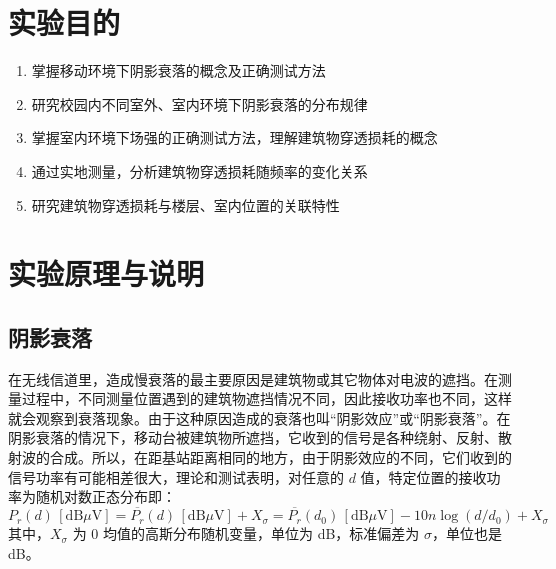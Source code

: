 \documentclass{../ElectromagneticFieldTemplate}
\newcommand{\dbmv}{\text{dB}\mu\text{V}}
\begin{document}
\maketitle


\section{实验目的}
\begin{enumerate}
    \item 掌握移动环境下阴影衰落的概念及正确测试方法
    \item 研究校园内不同室外、室内环境下阴影衰落的分布规律
    \item 掌握室内环境下场强的正确测试方法，理解建筑物穿透损耗的概念
    \item 通过实地测量，分析建筑物穿透损耗随频率的变化关系
    \item 研究建筑物穿透损耗与楼层、室内位置的关联特性
\end{enumerate}

\section{实验原理与说明}

\subsection{阴影衰落}

在无线信道里，造成慢衰落的最主要原因是建筑物或其它物体对电波的遮挡。在测量过程中，不同测量位置遇到的建筑物遮挡情况不同，因此接收功率也不同，这样就会观察到衰落现象。由于这种原因造成的衰落也叫“阴影效应”或“阴影衰落”。在阴影衰落的情况下，移动台被建筑物所遮挡，它收到的信号是各种绕射、反射、散射波的合成。所以，在距基站距离相同的地方，由于阴影效应的不同，它们收到的信号功率有可能相差很大，理论和测试表明，对任意的 \(d\) 值，特定位置的接收功率为随机对数正态分布即：
\begin{equation}
P_r(d)\,[\dbmv] = \overline{P_r}(d)\,[\dbmv] + X_{\sigma} = \overline{P_r}(d_0)\,[\dbmv] - 10n\log(d/d_0) + X_{\sigma} \tag{5-11}
\end{equation}
其中，\(X_{\sigma}\) 为 0 均值的高斯分布随机变量，单位为 dB，标准偏差为 \(\sigma\)，单位也是 dB。
\end{document}
